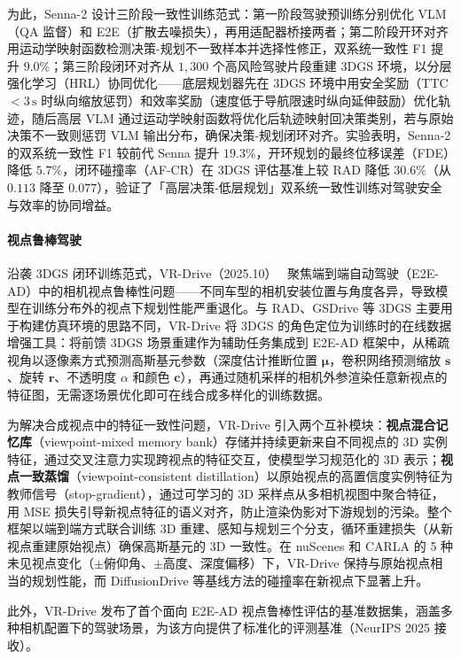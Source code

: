 为此，Senna-2 设计三阶段一致性训练范式：第一阶段驾驶预训练分别优化 VLM（QA 监督）和 E2E（扩散去噪损失），再用适配器桥接两者；第二阶段开环对齐用运动学映射函数检测决策-规划不一致样本并选择性修正，双系统一致性 F1 提升 $9.0\%$；第三阶段闭环对齐从 $1{,}300$ 个高风险驾驶片段重建 3DGS 环境，以分层强化学习（HRL）协同优化——底层规划器先在 3DGS 环境中用安全奖励（TTC $< 3\,\text{s}$ 时纵向缩放惩罚）和效率奖励（速度低于导航限速时纵向延伸鼓励）优化轨迹，随后高层 VLM 通过运动学映射函数将优化后轨迹映射回决策类别，若与原始决策不一致则惩罚 VLM 输出分布，确保决策-规划闭环对齐。实验表明，Senna-2 的双系统一致性 F1 较前代 Senna 提升 $19.3\%$，开环规划的最终位移误差（FDE）降低 $5.7\%$，闭环碰撞率（AF-CR）在 3DGS 评估基准上较 RAD 降低 $30.6\%$（从 $0.113$ 降至 $0.077$），验证了「高层决策-低层规划」双系统一致性训练对驾驶安全与效率的协同增益。

\paragraph{视点鲁棒驾驶}

沿袭 3DGS 闭环训练范式，VR-Drive（2025.10）~\cite{2510_23205} 聚焦端到端自动驾驶（E2E-AD）中的相机视点鲁棒性问题——不同车型的相机安装位置与角度各异，导致模型在训练分布外的视点下规划性能严重退化。与 RAD、GSDrive 等 3DGS 主要用于构建仿真环境的思路不同，VR-Drive 将 3DGS 的角色定位为训练时的在线数据增强工具：将前馈 3DGS 场景重建作为辅助任务集成到 E2E-AD 框架中，从稀疏视角以逐像素方式预测高斯基元参数（深度估计推断位置 $\boldsymbol{\mu}$，卷积网络预测缩放 $\mathbf{s}$、旋转 $\mathbf{r}$、不透明度 $\alpha$ 和颜色 $\mathbf{c}$），再通过随机采样的相机外参渲染任意新视点的特征图，无需逐场景优化即可在线合成多样化的训练数据。

为解决合成视点中的特征一致性问题，VR-Drive 引入两个互补模块：\textbf{视点混合记忆库}（viewpoint-mixed memory bank）存储并持续更新来自不同视点的 3D 实例特征，通过交叉注意力实现跨视点的特征交互，使模型学习规范化的 3D 表示；\textbf{视点一致蒸馏}（viewpoint-consistent distillation）以原始视点的高置信度实例特征为教师信号（stop-gradient），通过可学习的 3D 采样点从多相机视图中聚合特征，用 MSE 损失引导新视点特征的语义对齐，防止渲染伪影对下游规划的污染。整个框架以端到端方式联合训练 3D 重建、感知与规划三个分支，循环重建损失（从新视点重建原始视点）确保高斯基元的 3D 一致性。在 nuScenes 和 CARLA 的 5 种未见视点变化（$\pm$俯仰角、$\pm$高度、深度偏移）下，VR-Drive 保持与原始视点相当的规划性能，而 DiffusionDrive 等基线方法的碰撞率在新视点下显著上升。

此外，VR-Drive 发布了首个面向 E2E-AD 视点鲁棒性评估的基准数据集，涵盖多种相机配置下的驾驶场景，为该方向提供了标准化的评测基准（NeurIPS 2025 接收）。

